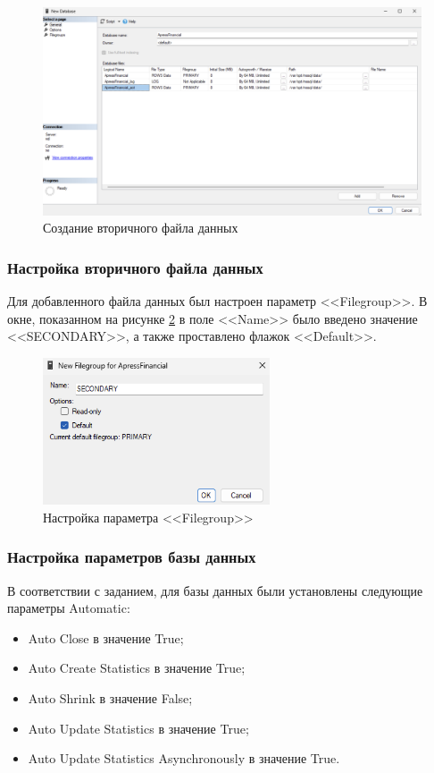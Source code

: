 \documentclass[a4paper, 14pt]{extarticle}
\begin{document}
\begin{figure}[H]
  \centering
  \includegraphics[width=\textwidth]{images/task-1/step-2.png}
  \caption{Создание вторичного файла данных}
  \label{fig:task-1/step-2.png}
\end{figure}

\subsubsection{Настройка вторичного файла данных}

Для добавленного файла данных был настроен параметр <<Filegroup>>. В окне,
показанном на рисунке \ref{fig:task-1/step-3.png} в поле <<Name>> было введено
значение <<SECONDARY>>, а также проставлено флажок <<Default>>.

\begin{figure}[H]
  \centering
  \includegraphics[width=0.6\textwidth]{images/task-1/step-3.png}
  \caption{Настройка параметра <<Filegroup>>}
  \label{fig:task-1/step-3.png}
\end{figure}

\subsubsection{Настройка параметров базы данных}

В соответствии с заданием, для базы данных были установлены следующие параметры
Automatic:
\begin{itemize}
  \item Auto Close в значение True;
  \item Auto Create Statistics в значение True;
  \item Auto Shrink в значение False;
  \item Auto Update Statistics в значение True;
  \item Auto Update Statistics Asynchronously в значение True.
\end{itemize}
\end{document}

